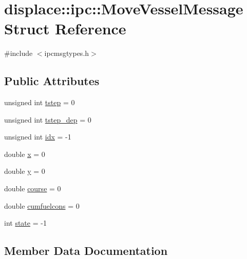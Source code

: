 \hypertarget{structdisplace_1_1ipc_1_1_move_vessel_message}{}\section{displace\+::ipc\+::Move\+Vessel\+Message Struct Reference}
\label{structdisplace_1_1ipc_1_1_move_vessel_message}


{\ttfamily \#include $<$ipcmsgtypes.\+h$>$}

\subsection*{Public Attributes}
\begin{DoxyCompactItemize}
\item 
unsigned int \mbox{\hyperlink{structdisplace_1_1ipc_1_1_move_vessel_message_af4afb6e677fbfc5ce9811a6b40118407}{tstep}} = 0
\item 
unsigned int \mbox{\hyperlink{structdisplace_1_1ipc_1_1_move_vessel_message_a1c28614f1bcb069c109db0ce22b51d34}{tstep\+\_\+dep}} = 0
\item 
unsigned int \mbox{\hyperlink{structdisplace_1_1ipc_1_1_move_vessel_message_a99f67e73ec221d7e93e1aa82d5a8fc63}{idx}} = -\/1
\item 
double \mbox{\hyperlink{structdisplace_1_1ipc_1_1_move_vessel_message_a4b429e98e7fe85e10eda25bcddf9ccf7}{x}} = 0
\item 
double \mbox{\hyperlink{structdisplace_1_1ipc_1_1_move_vessel_message_a8c8708c18385874914cb72d28c125f67}{y}} = 0
\item 
double \mbox{\hyperlink{structdisplace_1_1ipc_1_1_move_vessel_message_a85f01d249d4b2871643221933c3bea20}{course}} = 0
\item 
double \mbox{\hyperlink{structdisplace_1_1ipc_1_1_move_vessel_message_aebb1d6b5b74ced2b9c334d7030177aa7}{cumfuelcons}} = 0
\item 
int \mbox{\hyperlink{structdisplace_1_1ipc_1_1_move_vessel_message_a459037664cd7c77bf0ac085ac42be62a}{state}} = -\/1
\end{DoxyCompactItemize}


\subsection{Member Data Documentation}
\mbox{\label{structdisplace_1_1ipc_1_1_move_vessel_message_a85f01d249d4b2871643221933c3bea20}} 
